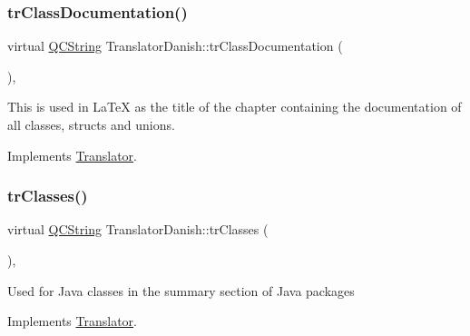 \mbox{\label{class_translator_danish_ae4a2fb26324d398306b2d6910edb85e1}} 
\subsubsection{\texorpdfstring{trClassDocumentation()}{trClassDocumentation()}}
{\footnotesize\ttfamily virtual \mbox{\hyperlink{class_q_c_string}{Q\+C\+String}} Translator\+Danish\+::tr\+Class\+Documentation (\begin{DoxyParamCaption}{ }\end{DoxyParamCaption})\hspace{0.3cm}{\ttfamily [inline]}, {\ttfamily [virtual]}}

This is used in La\+TeX as the title of the chapter containing the documentation of all classes, structs and unions. 

Implements \mbox{\hyperlink{class_translator}{Translator}}.

\mbox{\label{class_translator_danish_a36581fbf7c66b425997625deac22f3c3}} 
\subsubsection{\texorpdfstring{trClasses()}{trClasses()}}
{\footnotesize\ttfamily virtual \mbox{\hyperlink{class_q_c_string}{Q\+C\+String}} Translator\+Danish\+::tr\+Classes (\begin{DoxyParamCaption}{ }\end{DoxyParamCaption})\hspace{0.3cm}{\ttfamily [inline]}, {\ttfamily [virtual]}}

Used for Java classes in the summary section of Java packages 

Implements \mbox{\hyperlink{class_translator}{Translator}}.

\mbox{\label{class_translator_danish_a300b3f211445feffcae15f627baf5200}} 
